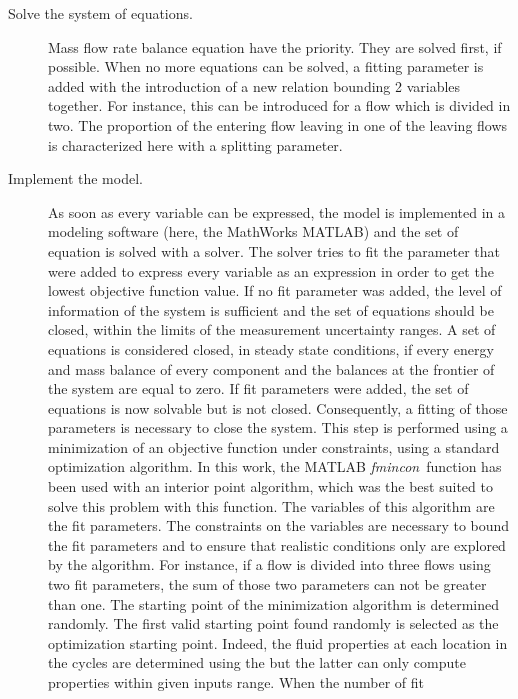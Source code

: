 \begin{description}
\item[Solve the system of equations.] Mass flow rate balance equation
  have the priority. They are solved first, if possible. When no more
  equations can be solved, a fitting parameter is added with the
  introduction of a new relation bounding 2 variables together. For
  instance, this can be introduced for a flow which is divided in
  two. The proportion of the entering flow leaving in one of the
  leaving flows is characterized here with a splitting parameter.

\item[Implement the model.] As soon as every variable can be
  expressed, the model is implemented in a modeling software (here,
  the MathWorks MATLAB) and the set of equation is solved with a
  solver. The solver tries to fit the parameter that were added to
  express every variable as an expression in order to get the lowest
  objective function value. If no fit parameter was added, the level
  of information of the system is sufficient and the set of equations
  should be closed, within the limits of the measurement uncertainty
  ranges. A set of equations is considered closed, in steady state
  conditions, if every energy and mass balance of every component and
  the balances at the frontier of the system are equal to zero. If fit
  parameters were added, the set of equations is now solvable but is
  not closed. Consequently, a fitting of those parameters is necessary
  to close the system. This step is performed using a minimization of
  an objective function under constraints, using a standard
  optimization algorithm. In this work, the MATLAB
  \textit{fmincon}\,\citep{fmincon2014a} function has been used with
  an interior point algorithm, which was the best suited to solve this
  problem \citep{fmincon2014a-interiorpoint} with this function. The
  variables of this algorithm are the fit parameters. The constraints
  on the variables are necessary to bound the fit parameters and to
  ensure that realistic conditions only are explored by the
  algorithm. For instance, if a flow is divided into three flows using
  two fit parameters, the sum of those two parameters can not be
  greater than one. The starting point of the minimization algorithm
  is determined randomly. The first valid starting point found
  randomly is selected as the optimization starting point. Indeed, the
  fluid properties at each location in the cycles are determined using
  the \REFPROP{} \citep{REFPROP90} but the latter can only compute
  properties within given inputs range. When the number of fit

\end{description}
